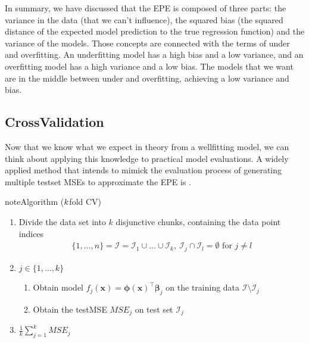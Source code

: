 \documentclass[letterpaper,10pt,english]{jupyterBook}
\begin{document}
\sphinxAtStartPar
In summary, we have discussed that the EPE is composed of three parts: the variance in the data (that we can’t influence), the squared bias (the squared distance of the expected model prediction to the true regression function) and the variance of the models. Those concepts are connected with the terms of under\sphinxhyphen{} and overfitting. An underfitting model has a high bias and a low variance, and an overfitting model has a high variance and a low bias. The models that we want are in the middle between under\sphinxhyphen{} and overfitting, achieving a low variance and bias.


\subsection{Cross\sphinxhyphen{}Validation}
\label{\detokenize{regression_bias_var:cross-validation}}
\sphinxAtStartPar
Now that we know what we expect in theory from a well\sphinxhyphen{}fitting model, we can think about applying this knowledge to practical model evaluations. A widely applied method that intends to mimick the evaluation process of generating multiple test\sphinxhyphen{}set MSEs to approximate the EPE is .
\label{None:algorithm-3}
\begin{sphinxadmonition}{note}{Algorithm  (\protect\(k\protect\)\sphinxhyphen{}fold CV)}


\begin{enumerate}
%
\item {} 
\sphinxAtStartPar
Divide the data set into \(k\) disjunctive chunks, containing the data point indices \begin{equation*}
\begin{split}\{1,\ldots,n\}=\mathcal{I}=\mathcal{I}_1\cup\ldots \cup\mathcal{I}_k,\  \mathcal{I}_j\cap\mathcal{I}_l=\emptyset \text{ for } j\neq l\end{split}
\end{equation*}

\item {} 
\sphinxAtStartPar
{} \(j\in\{1,\ldots,k\}\)
\begin{enumerate}
%
\item {} 
\sphinxAtStartPar
Obtain model \(f_{j}(\mathbf{x})=\bm{\phi}(\mathbf{x})^\top \bm{\beta}_j\) on the training data \(\mathcal{I}\setminus\mathcal{I}_j\)

\item {} 
\sphinxAtStartPar
Obtain the test\sphinxhyphen{}MSE \(MSE_j\) on test set \(\mathcal{I}_j\)

\end{enumerate}

\item {} 
\sphinxAtStartPar
{} \(\frac{1}{k}\sum_{j=1}^k MSE_j\)

\end{enumerate}
\end{sphinxadmonition}
\end{document}
